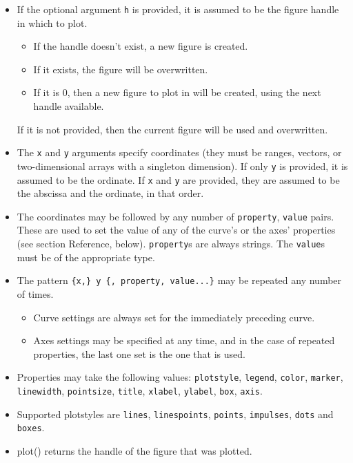 \documentclass[11pt]{article}
\newcommand{\cmd}[1]{\texttt{#1}}
\begin{document}
\begin{itemize}
	\item If the optional argument \cmd{h} is provided, it is assumed to be the
		figure handle in which to plot.
		\begin{itemize}
			\item If the handle doesn't exist, a new figure is created.
			\item If it exists, the figure will be overwritten.
			\item If it is 0, then a new figure to plot in will be created,
				using the next handle available.
		\end{itemize}
		If it is not provided, then the current figure will be used and
		overwritten.
	\item The \cmd{x} and \cmd{y} arguments specify coordinates (they must be ranges, vectors, or
		two-dimensional arrays with a singleton dimension). If only \cmd{y} is
		provided, it is assumed to be the ordinate. If \cmd{x} and \cmd{y} are provided, they
		are assumed to be the abscissa and the ordinate, in that order.
	\item The coordinates may be followed by any number of
		\cmd{property}, \cmd{value} pairs. These are used to set the value of
		any of the curve's or the axes' properties (see section Reference,
		below). \cmd{property}s are always strings. The \cmd{value}s must be of
		the appropriate type.
	\item The pattern \cmd{\{x,\} y \{, property, value...\}} may be repeated
		any number of times.
		\begin{itemize}
			\item Curve settings are always set for the immediately
				preceding curve.
			\item Axes settings may be specified at any time,
				and in the case of repeated properties, the last one set is the
				one that is used.
		\end{itemize}
	\item Properties may take the following values: \cmd{plotstyle},
		\cmd{legend}, \cmd{color},
		\cmd{marker}, \cmd{linewidth}, \cmd{pointsize}, \cmd{title},
		\cmd{xlabel}, \cmd{ylabel}, \cmd{box}, \cmd{axis}.
	\item Supported plotstyles are \cmd{lines}, \cmd{linespoints},
		\cmd{points}, \cmd{impulses}, \cmd{dots} and \cmd{boxes}.
	\item plot() returns the handle of the figure that was plotted.
\end{itemize}
\end{document}
